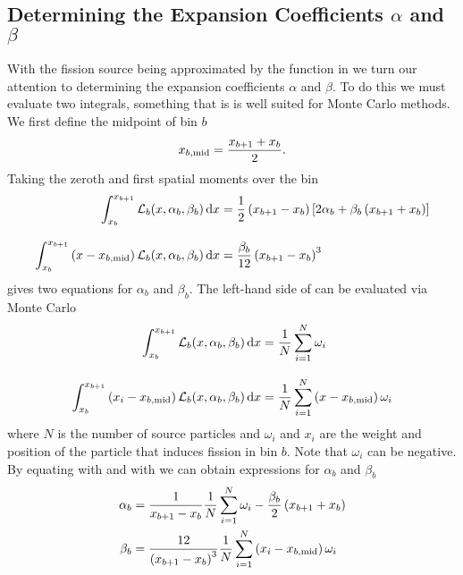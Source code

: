 \subsection{Determining the Expansion Coefficients $\alpha$ and $\beta$}
With the fission source being approximated by the function in  we turn our attention to determining the expansion coefficients $\alpha$ and $\beta$.  To do this we must evaluate two integrals, something that is is well suited for Monte Carlo methods.  We first define the midpoint of bin $b$
\begin{equation}
    x_{b,\mathrm{mid}} = \frac{x_{b+1}+x_b}{2}.
    \label{eq:xmid}
\end{equation}
Taking the zeroth and first spatial moments over the bin
\begin{subequations}\label{eq:SpatialMoments}\begin{align}
        \int_{x_b}^{x_{b+1}} \mathcal{L}_b(x, \alpha_b, \beta_b) \mathop{}\!\mathrm{d} x  &= \frac{1}{2}\left(x_{b+1} - x_b\right)\left[2\alpha_b + \beta_b\left(x_{b+1} + x_b\right)\right] \label{eq:ZerothMoment} \\[2ex]
        \int_{x_b}^{x_{b+1}} \left(x-x_{b,\mathrm{mid}}\right)\mathcal{L}_b(x, \alpha_b, \beta_b) \mathop{}\!\mathrm{d} x &= \frac{\beta_b}{12}\left(x_{b+1} - x_b\right)^3 \label{eq:FirstMoment}
    \end{align}
\end{subequations}
gives two equations for $\alpha_b$ and $\beta_b$.  The left-hand side of  can be evaluated via Monte Carlo
\begin{subequations}\label{eq:SpatialMomentsMC}\begin{align}
    \int_{x_b}^{x_{b+1}} \mathcal{L}_b(x, \alpha_b, \beta_b) \mathop{}\!\mathrm{d} x &= \frac{1}{N}\sum_{i=1}^N \omega_i  \label{eq:ZerothMomentMC} \\[2ex]
    \int_{x_b}^{x_{b+1}} \left(x_i-x_{b,\mathrm{mid}}\right)\mathcal{L}_b(x, \alpha_b, \beta_b) \mathop{}\!\mathrm{d} x &= \frac{1}{N}\sum_{i=1}^N \left(x-x_{b,\mathrm{mid}}\right)\omega_i \label{eq:FirstMomentMC}
    \end{align}
\end{subequations}
where $N$ is the number of source particles and $\omega_i$ and $x_i$ are the weight and position of the particle that induces fission in bin $b$.  Note that $\omega_i$ can be negative.  By equating  with  and  with  we can obtain expressions for $\alpha_b$ and $\beta_b$
\begin{subequations}
    \begin{align}
        \alpha_b &= \frac{1}{x_{b+1}-x_b}\frac{1}{N} \sum_{i=1}^N \omega_i - \frac{\beta_b}{2}\left(x_{b+1}+x_b\right) \label{eq:alpha_b} \\
        \beta_b &= \frac{12}{\left(x_{b+1}-x_b\right)^3}\frac{1}{N} \sum_{i=1}^N \left(x_i-x_{b,\mathrm{mid}}\right)\omega_i \label{eq:beta_b}
    \end{align}
    \label{eq:ExpansionCoefficients}
\end{subequations}

